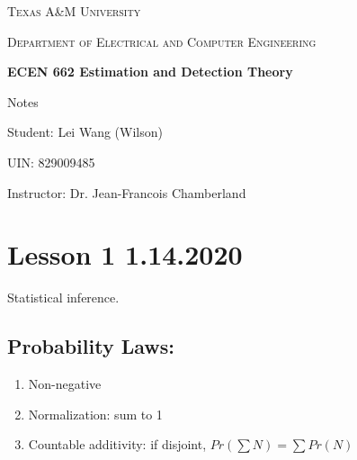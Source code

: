 \documentclass[11pt,letterpaper,titlepage]{article}
\begin{document}
\begin{titlepage}
  \centering
	{\scshape\large Texas A\&M University \par}
	\vspace{1cm}
	{\scshape\Large Department of Electrical and Computer Engineering \par}
	\vspace{4cm}
    \vspace{0.5cm}
	{\huge\bfseries ECEN 662 Estimation and Detection Theory\par}
	\vspace{4cm}
	{\Large Notes\par}
	\vspace{1cm}
	{\Large Student: Lei Wang (Wilson)\par}
	\vspace{1cm}
	{\Large UIN: 829009485\par}
	\vspace{1cm}
	{\Large Instructor: Dr. Jean-Francois Chamberland\par}
	\vspace{4cm}
	\vfill


\end{titlepage}

\newpage

\tableofcontents{}

\newpage

\section{Lesson 1 1.14.2020}

Statistical inference.

\subsection{Probability Laws:}

\begin{enumerate}
    \item Non-negative
    
    \item Normalization: sum to 1
    
    \item Countable additivity: if disjoint, $Pr(\sum N)=\sum Pr(N)$
    
\end{enumerate}
\end{document}

